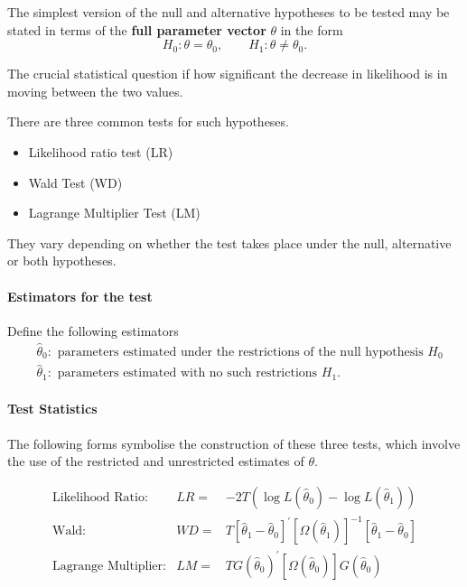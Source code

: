 \documentclass[11pt]{article}
\begin{document}
The simplest version of the null and alternative hypotheses to be tested may be stated in terms of the \textbf{full parameter vector} $\theta$ in the form
\[H_0: \theta = \theta_0, \qquad H_1: \theta \neq \theta_0.\]

The crucial statistical question if how significant the decrease in likelihood is in moving between the two values.

There are three common tests for such hypotheses.
\begin{itemize}
    \item Likelihood ratio test (LR)
    \item Wald Test (WD)
    \item Lagrange Multiplier Test (LM)
\end{itemize}
They vary depending on whether the test takes place under the null, alternative or both hypotheses.

\paragraph{Estimators for the test}\mbox{}

Define the following estimators
\begin{align*}
    &\hat{\theta}_0: \text{ parameters estimated under the restrictions of the null hypothesis } H_0 \\
    & \hat{\theta}_1: \text{ parameters estimated with no such restrictions } H_1.
\end{align*}

\paragraph{Test Statistics} \mbox{}

The following forms symbolise the construction of these three tests, which involve the use of the restricted and unrestricted estimates of $\theta$.

\begin{equation}
    \begin{array}{ccc}
    \text{Likelihood Ratio:} & LR= & -2 T\left(\log L\left(\widehat{\theta}_0\right)-\log L\left(\widehat{\theta}_1\right)\right) \\
    \text{Wald:} & WD =& T\left[\widehat{\theta}_1-\widehat{\theta}_0\right]^{\prime}\left[\Omega\left(\widehat{\theta}_1\right)\right]^{-1}\left[\widehat{\theta}_1-\widehat{\theta}_0\right] \\
    \text{Lagrange Multiplier:}& LM=& T G\left(\widehat{\theta}_0\right)^{\prime}\left[\Omega\left(\widehat{\theta}_0\right)\right] G\left(\widehat{\theta}_0\right)
\end{array}
\end{equation}
\end{document}
